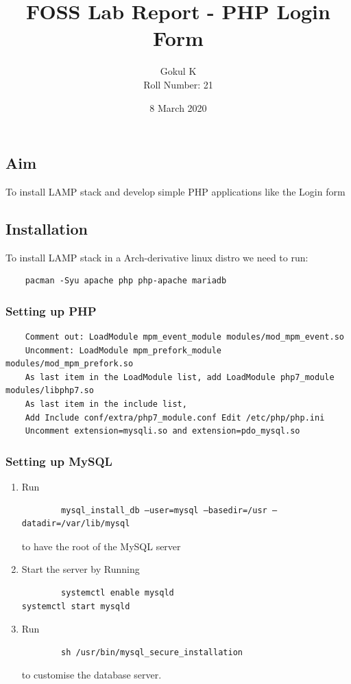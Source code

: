 \documentclass{article}
\begin{document}
\title{FOSS Lab Report - PHP Login Form}
\author{Gokul K\\[2\baselineskip]
Roll Number: 21\\[2\baselineskip]}
\date{8 March 2020}

\maketitle

\newpage

\tableofcontents

\newpage

\setcounter{section}{25}
\subsection{Aim}
To install LAMP stack and develop simple PHP applications like the Login form

\newpage

\subsection{Installation}
To install LAMP stack in  a Arch-derivative linux distro we need to run:
\begin{verbatim}
	pacman -Syu apache php php-apache mariadb 
\end{verbatim}
\subsubsection{Setting up PHP}
\begin{verbatim}
	Comment out: LoadModule mpm_event_module modules/mod_mpm_event.so
	Uncomment: LoadModule mpm_prefork_module modules/mod_mpm_prefork.so 
	As last item in the LoadModule list, add LoadModule php7_module modules/libphp7.so 
	As last item in the include list, 
	Add Include conf/extra/php7_module.conf Edit /etc/php/php.ini 
	Uncomment extension=mysqli.so and extension=pdo_mysql.so
\end{verbatim}

\subsubsection{Setting up MySQL}
\begin{enumerate}
	\item Run \begin{verbatim}
		mysql_install_db –user=mysql –basedir=/usr –datadir=/var/lib/mysql
	\end{verbatim}
	to have the root of the MySQL server

	\item Start the server by Running
	\begin{verbatim}
		systemctl enable mysqld 
systemctl start mysqld 
	\end{verbatim}

	\item Run \begin{verbatim}
		sh /usr/bin/mysql_secure_installation 
	\end{verbatim} to customise the database server.
\end{enumerate}
\end{document}
